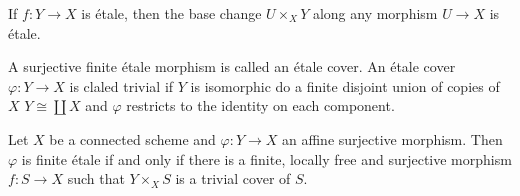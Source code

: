 \begin{lemma}
  If $f: Y \to X$ is \'etale, then the base change $U \times_X Y$ along any morphism $U \to X$ is \'etale.
\end{lemma}
\begin{definition}
  A surjective finite \'etale morphism is called an \'etale cover. An \'etale cover $\varphi : Y \to X$ is claled trivial if $Y$ is isomorphic do a finite disjoint union of copies of $X$ $Y \cong \coprod X$ and $\varphi$ restricts to the identity on each component.
\end{definition}

\begin{theorem} 
  \label{locallyTrivial}
  Let $X$ be a connected scheme and $\varphi : Y \to X$ an affine surjective morphism. Then $\varphi$ is finite \'etale if and only if there is a finite, locally free and surjective morphism $f: S \to X$ such that $Y \times_X S$ is a trivial cover of $S$.
\end{theorem}
